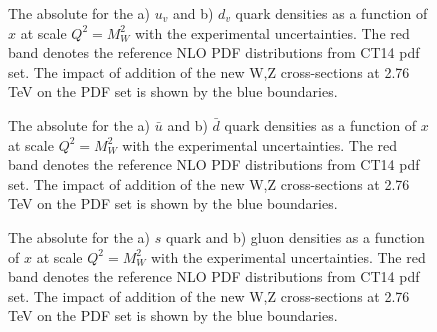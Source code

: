 \begin{figure}[!h]
\begin{minipage}[h]{0.49\linewidth}
\end{minipage}
\hfill
\begin{minipage}[h]{0.49\linewidth}
\end{minipage}
\caption{The absolute for the a) $u_v$ and b) $d_v$ quark densities as a function of $x$ at scale $Q^2=M_W^2$ with the experimental uncertainties. The red band denotes the reference NLO PDF distributions from CT14 pdf set. The impact of addition of the new W,Z cross-sections at 2.76 TeV on the PDF set is shown by the blue boundaries.}
\label{fig:AppC3}
\end{figure}

\begin{figure}[!h]
\begin{minipage}[h]{0.49\linewidth}
\end{minipage}
\hfill
\begin{minipage}[h]{0.49\linewidth}
\end{minipage}
\caption{The absolute for the a) $\bar{u}$ and b) $\bar{d}$ quark densities as a function of $x$ at scale $Q^2=M_W^2$ with the experimental uncertainties. The red band denotes the reference NLO PDF distributions from CT14 pdf set. The impact of addition of the new W,Z cross-sections at 2.76 TeV on the PDF set is shown by the blue boundaries.}
\end{figure}

\begin{figure}[!h]
\begin{minipage}[h]{0.49\linewidth}
\end{minipage}
\hfill
\begin{minipage}[h]{0.49\linewidth}
\end{minipage}
\caption{The absolute for the a) $s$ quark and b) gluon densities as a function of $x$ at scale $Q^2=M_W^2$ with the experimental uncertainties. The red band denotes the reference NLO PDF distributions from CT14 pdf set. The impact of addition of the new W,Z cross-sections at 2.76 TeV on the PDF set is shown by the blue boundaries.}
\label{fig:AppC4}
\end{figure}
